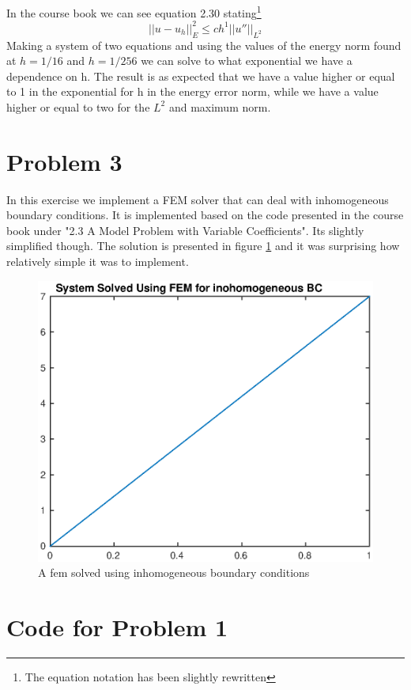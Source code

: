 \documentclass[11pt]{article}
\begin{document}
In the course book we can see equation 2.30 stating\footnote{The equation notation has been slightly rewritten}
\begin{equation}
	|| u - u_h ||^2_E \leq c h^1 ||u''||_{L^2}
\end{equation}
Making a system of two equations and using the values of the energy norm found at $h = 1/16$ and $h = 1/256$ we can solve to what exponential we have a dependence on h. The result is as expected that we have a value higher or equal to 1 in the exponential for h in the energy error norm, while we have a value higher or equal to two for the $L^2$ and maximum norm. 

\section{Problem 3}
In this exercise we implement a FEM solver that can deal with inhomogeneous boundary conditions. It is implemented based on the code presented in the course book under "2.3 A Model Problem with Variable Coefficients". Its slightly simplified though. The solution is presented in figure \ref{fig:inhom} and it was surprising how relatively simple it was to implement. 
\begin{figure}[H]
	\centering
	\includegraphics[width=1\textwidth]{../ex3/inhom}
	\caption{A fem solved using inhomogeneous boundary conditions}
	\label{fig:inhom}
\end{figure}


\newpage
\appendix
\section{Code for Problem 1}
\end{document}
